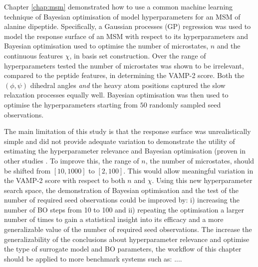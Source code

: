 Chapter \ref{chap:msm} demonstrated how to use a common machine learning technique of Bayesian optimisation of model hyperparameters for an MSM of alanine dipeptide. Specifically, a Gaussian processes (GP) regression was used to model the response surface of an MSM with respect to its hyperparameters and Bayesian optimisation used to optimise the number of microstates, $n$ and the continuous features $\chi$, in basis set construction. Over the range of hyperparameters tested the number of microstates was shown to be irrelevant, compared to the peptide features, in determining the VAMP-2 score. Both the $(\phi, \psi)$ dihedral angles \emph{and} the heavy atom positions captured the slow relaxation processes equally well. Bayesian optimisation was then used to optimise the hyperparameters starting from $50$ randomly sampled seed observations.

The main limitation of this study is that the response surface was unrealistically simple and did not provide adequate variation to demonstrate the utility of estimating the hyperparameter relevance and Bayesian optimisation (proven in other studies \cite{bergstraAlgorithmsHyperParameterOptimizationa}\cite{bergstrajamesbergstraRandomSearchHyperParameter2012}. To improve this,  the range of $n$, the number of microstates, should be shifted from $[10, 1000]$ to $[2, 100]$. This would allow meaningful variation in the VAMP-2 score with respect to both $n$ and $\chi$.  Using this new hyperparameter search space, the demonstration of Bayesian optimisation and the test of the number of required seed observations could be improved by: i) increasing the number of BO steps from \num{10} to \num{100} and ii) repeating the optimisation a larger number of times to gain a statistical insight into its efficacy and a more generalizable value of the number of required seed observations. The increase the generalizability of the conclusions about hyperparameter relevance and optimise the type of surrogate model and BO parameters, the workflow of this chapter should be applied to more benchmark systems such as: .... 

